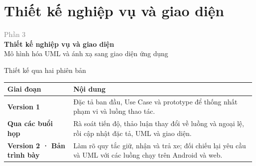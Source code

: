 \documentclass[aspectratio=169]{beamer}
\newcommand{\ChapterDivider}[3]{%
  \begin{frame}[plain]
    \centering\vspace{1.4cm}
    {\Large\textcolor{gray}{#1}}\\[0.25cm]
    {\Huge\textbf{\textcolor{BKTemplate}{#2}}}\\[0.5cm]
    {\normalsize #3}
  \end{frame}}
\begin{document}
\section{Thiết kế nghiệp vụ và giao diện}
\ChapterDivider{Phần 3}{Thiết kế nghiệp vụ và giao diện}{Mô hình hóa UML và ánh xạ sang giao diện ứng dụng}

\begin{frame}{Thiết kế qua hai phiên bản}
  \centering
  \setlength{\tabcolsep}{6pt}
  {\small
    \begin{tabular}{@{}L{3.35cm}L{10.35cm}@{}}
      \toprule
      \textbf{Giai đoạn}                 & \textbf{Nội dung}                                                   \\
      \midrule
      \textbf{Version 1}                 &
      Đặc tả ban đầu, Use Case và prototype để thống nhất phạm vi và luồng thao tác.                           \\
      \addlinespace[8pt]
      \textbf{Qua các buổi họp}          &
      Rà soát tiến độ, thảo luận thay đổi về luồng và ngoại lệ, rồi cập nhật đặc tả, UML và giao diện.         \\
      \addlinespace[8pt]
      \textbf{Version 2 · Bản trình bày} &
      Làm rõ quy tắc giữ, nhận và trả xe; đối chiếu lại yêu cầu và UML với các luồng chạy trên Android và web. \\
      \bottomrule
    \end{tabular}
  }
  \vspace{0.42cm}
\end{frame}
\end{document}
